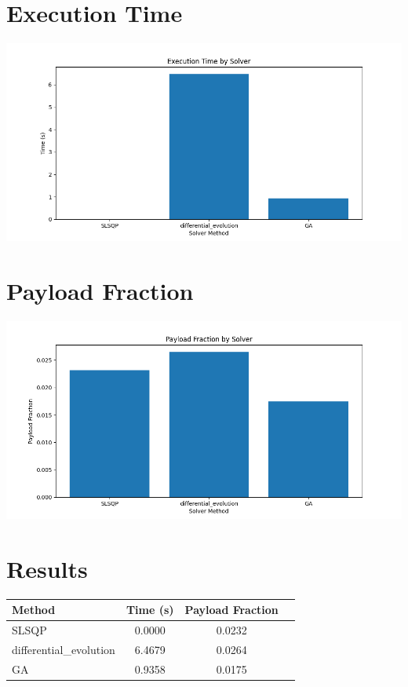 \documentclass{article}
\begin{document}
\section{Execution Time}
\includegraphics[width=\textwidth]{execution_time.png}

\section{Payload Fraction}
\includegraphics[width=\textwidth]{payload_fraction.png}

\section{Results}
\begin{tabular}{lccc}
\hline
Method & Time (s) & Payload Fraction \\
\hline
SLSQP & 0.0000 & 0.0232 \\
differential_evolution & 6.4679 & 0.0264 \\
GA & 0.9358 & 0.0175 \\

\hline
\end{tabular}
\end{document}
